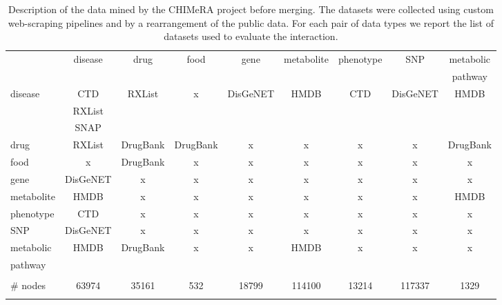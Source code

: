 \documentclass{standalone}
\begin{document}
\begin{table}
\hspace{-2cm}
\begin{tabular}{lcccccccc}
\hline\rowcolor{darkgrayrow}
                        & disease             & drug     & food     & gene     & metabolite & phenotype & SNP      & metabolic \\
\rowcolor{darkgrayrow}
                        &                     &          &          &          &            &           &          & pathway   \\
disease                 & CTD                 & RXList   &    x     & DisGeNET &  HMDB      & CTD       & DisGeNET & HMDB      \\
                        & RXList              &          &          &          &            &           &          &           \\
                        & SNAP                &          &          &          &            &           &          &           \\
drug                    &       RXList        & DrugBank & DrugBank &    x     &    x       &    x      &     x    & DrugBank  \\
food                    &          x          & DrugBank &    x     &    x     &    x       &    x      &     x    &    x      \\
gene                    &      DisGeNET       &    x     &    x     &    x     &    x       &    x      &     x    &    x      \\
metabolite              &       HMDB          &    x     &    x     &    x     &    x       &    x      &     x    & HMDB      \\
phenotype               &        CTD          &    x     &    x     &    x     &    x       &    x      &     x    &    x      \\
SNP                     &      DisGeNET       &    x     &    x     &    x     &    x       &    x      &     x    &    x      \\
metabolic               &        HMDB         & DrugBank &    x     &    x     &  HMDB      &    x      &     x    &    x      \\
pathway                 &                     &          &          &          &            &           &          &           \\
\hline\\
\# nodes                &  63974              & 35161    & 532      & 18799    &  114100    & 13214     & 117337   &  1329     \\
\hline\\
\end{tabular}
\caption{Description of the data mined by the \textsf{CHIMeRA} project before merging.
The datasets were collected using custom web-scraping pipelines and by a rearrangement of the public data.
For each pair of data types we report the list of datasets used to evaluate the interaction.
}
\label{tab:chimera_db}
\end{table}
\end{document}
